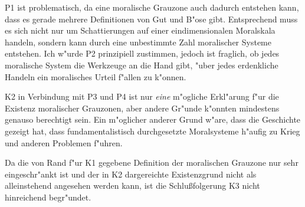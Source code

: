 \documentclass[a4paper]{article}
\begin{document}
P1 ist problematisch, da eine moralische Grauzone auch dadurch entstehen kann, dass es gerade mehrere Definitionen von Gut und B"ose gibt. Entsprechend muss es sich nicht nur um Schattierungen auf einer eindimensionalen Moralskala handeln, sondern kann durch eine unbestimmte Zahl moralischer Systeme entstehen. Ich w"urde P2 prinzipiell zustimmen, jedoch ist fraglich, ob jedes moralische System die Werkzeuge an die Hand gibt, "uber jedes erdenkliche Handeln ein moralisches Urteil f"allen zu k"onnen. 

K2 in Verbindung mit P3 und P4 ist nur \emph{eine} m"ogliche Erkl"arung f"ur die Existenz moralischer Grauzonen, aber andere Gr"unde k"onnten mindestens genauso berechtigt sein. Ein m"oglicher anderer Grund w"are, dass die Geschichte gezeigt hat, dass fundamentalistisch durchgesetzte Moralsysteme h"aufig zu Krieg und anderen Problemen f"uhren.

Da die von Rand f"ur K1 gegebene Definition der moralischen Grauzone nur sehr eingeschr"ankt ist und der in K2 dargereichte Existenzgrund nicht als alleinstehend angesehen werden kann, ist die Schlu\ss folgerung K3 nicht hinreichend begr"undet. 
\end{document}
